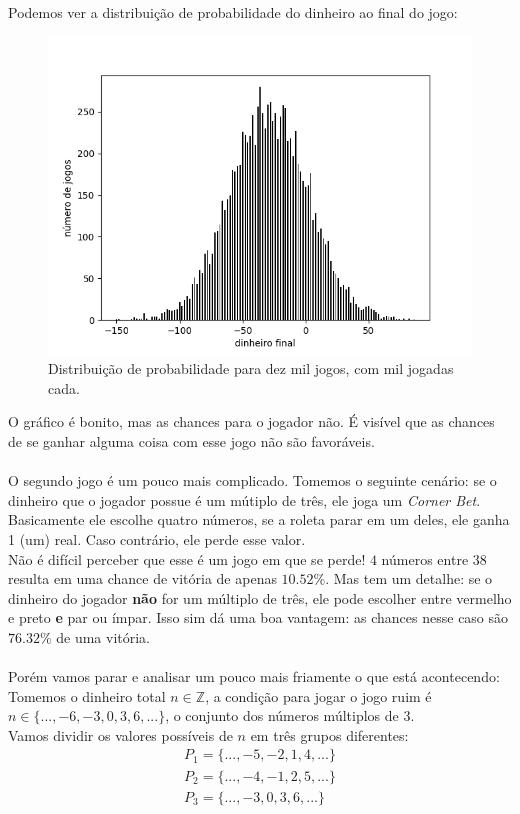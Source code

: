 \documentclass[12pt]{article}
\begin{document}
Podemos ver a distribuição de probabilidade do dinheiro ao final do jogo:

\begin{figure}[H]
\centering
\includegraphics[scale=0.8]{graph5.png}
\caption{Distribuição de probabilidade para dez mil jogos, com mil jogadas cada.}
\end{figure}

O gráfico é bonito, mas as chances para o jogador não. É visível que as chances de se ganhar alguma coisa com esse jogo não são favoráveis.\\
\\
O segundo jogo é um pouco mais complicado. Tomemos o seguinte cenário: se o dinheiro que o jogador possue é um mútiplo de três, ele joga um \textit{Corner Bet}. Basicamente ele escolhe quatro números, se a roleta parar em um deles, ele ganha 1 (um) real. Caso contrário, ele perde esse valor.\\
Não é difícil perceber que esse é um jogo em que se perde! $4$ números entre $38$ resulta em uma chance de vitória de apenas $10.52\%$. Mas tem um detalhe: se o dinheiro do jogador \textbf{não} for um múltiplo de três, ele pode escolher entre vermelho e preto \textbf{e} par ou ímpar. Isso sim dá uma boa vantagem: as chances nesse caso são $76.32\%$ de uma vitória.\\
\\
Porém vamos parar e analisar um pouco mais friamente o que está acontecendo:\\
Tomemos o dinheiro total $n \in \mathbb{Z}$, a condição para jogar o jogo ruim é $n \in \{..., -6, -3, 0, 3, 6, ...\}$, o conjunto dos números múltiplos de 3.\\
Vamos dividir os valores possíveis de $n$ em três grupos diferentes: 
\begin{align*}
P_{1} = \{..., -5, -2, 1, 4, ...\}\\
P_{2} =  \{..., -4, -1, 2, 5, ...\}\\
P_{3} = \{..., -3, 0, 3, 6, ...\}
\end{align*}
\end{document}
